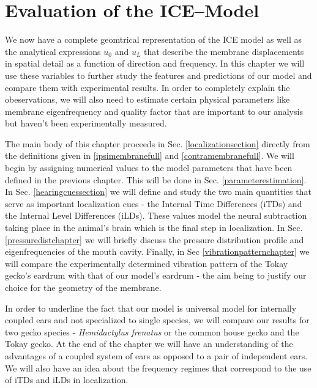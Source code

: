 \chapter{Evaluation of the ICE--Model}\label{modelanalysis}
We now have a complete geomtrical representation of the ICE model as well as
 the analytical expressions $u_0$ and $u_L$ that describe the membrane displacements
in spatial detail as a function of direction and frequency. In this chapter we will use these variables
to further study the features and predictions of our model and compare them with experimental results. In
order to completely explain the obeservations, we will also need to estimate certain physical parameters
like membrane eigenfrequency and quality factor that are important to our analysis but haven't been
experimentally measured.

The main body of this chapter proceeds in Sec. \ref{localizationsection} directly from the definitions given in \eqref{ipsimembranefull}
and \eqref{contramembranefull}. We will begin by assigning numerical values to the model parameters that have been defined
in the previous chapter. This will be done in Sec. \ref{parameterestimation}.
In Sec. \ref{hearingcuessection} we will define and study the two main quantities that serve as important localization
cues - the Internal Time Differences (iTDs) and the Internal Level Differences (iLDs). These values model the
neural subtraction taking place in the animal's brain which is the final step in localization.
In Sec. \ref{pressuredistchapter} we will
briefly discuss the pressure distribution profile and eigenfrequencies of the mouth cavity.
Finally, in Sec \ref{vibrationpatternchapter} we will compare the experimentally determined vibration pattern
of the Tokay gecko's eardrum with that of our model's eardrum - the aim being to justify our choice for the
geometry of the membrane.

In order to underline the fact that our model is universal model for internally coupled ears and not
specialized to single species, we will compare our results for two gecko species - \textit{Hemidactylus frenatus}
or the common house gecko and the Tokay gecko. At the end of the chapter we will have an understanding of the advantages of a coupled system of ears as opposed
to a pair of independent ears. We will also have an idea about the frequency regimes that correspond to the use
of iTDs and iLDs in localization.


